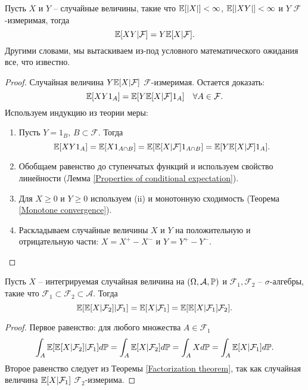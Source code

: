 \begin{thm} \label{Factorization theorem}
	Пусть $X$ и $Y$  -- случайные величины, такие что $\mathbb{E}[|X|]<\infty$, $\mathbb{E}[|XY|]<\infty$ и $Y$ $\mathcal{F}$-измеримая, тогда
	\[ \mathbb{E}[XY | \mathcal{F}]=Y\mathbb{E}[X|\mathcal{F}].  \]
	Другими словами, мы вытаскиваем из-под условного математического ожидания все, что известно.
\end{thm}

\begin{proof}
	Случайная величина $Y\mathbb{E}[X|\mathcal{F}]$ $\mathcal{F}$-измеримая. Остается доказать:
	\[\mathbb{E}[XY1_A]=\mathbb{E}[Y\mathbb{E}[X|\mathcal{F}]1_A] \quad \forall A \in \mathcal{F}. \]	
	Используем индукцию из теории меры:
	\begin{enumerate}
		\item Пусть $Y=1_B$, $B \subset \mathcal{F}$. Тогда
		\[ \mathbb{E}[XY1_A] = \mathbb{E}[X1_{A \cap  B}] = \mathbb{E}[\mathbb{E}[X|\mathcal{F}]1_{A \cap  B}]=\mathbb{E}[Y\mathbb{E}[X|\mathcal{F}]1_A]. \]
		\item Обобщаем равенство до ступенчатых функций и используем свойство линейности (Лемма \ref{Properties of conditional expectation}).
		\item Для $X \geq 0$ и $Y \geq 0$ используем (ii) и монотонную сходимость (Теорема \ref{Monotone convergence}).
		\item Раскладываем случайные величины $X$ и $Y$ на положительную и отрицательную части: $X=X^+-X^-$ и $Y=Y^+-Y^-$.
	\end{enumerate}
\end{proof}

\begin{thm}  \label{Tower property}
	Пусть $X$ -- интегрируемая случайная величина на $(\Omega, \mathcal{A}, \mathbb{P})$ и $\mathcal{F}_1, \mathcal{F}_2$ -- $\sigma$-алгебры, такие что $\mathcal{F}_1 \subset \mathcal{F}_2 \subset \mathcal{A}$. Тогда
	\[ \mathbb{E}[\mathbb{E}[X|\mathcal{F}_2]|\mathcal{F}_1] = \mathbb{E}[X|\mathcal{F}_1]=\mathbb{E}[\mathbb{E}[X|\mathcal{F}_1]\mathcal{F}_2]. \]
\end{thm}
	
\begin{proof}
	Первое равенство: для любого множества $A \in \mathcal{F}_1$
	\[ \int_{A}\mathbb{E}[\mathbb{E}[X|\mathcal{F}_2]|\mathcal{F}_1] d\mathbb{P} = \int_A \mathbb{E}[X|\mathcal{F}_2] d\mathbb{P}=\int_AXd\mathbb{P}=\int_A\mathbb{E}[X|\mathcal{F}_1]d\mathbb{P}. \]
	Второе равенство следует из Теоремы \ref{Factorization theorem}, так как случайная величина $\mathbb{E}[X|\mathcal{F}_1]$ $\mathcal{F}_2$-измерима.
\end{proof}

